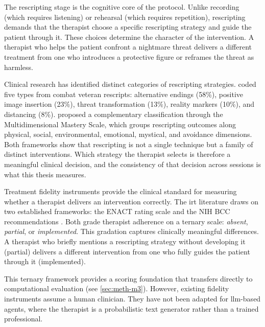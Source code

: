 The rescripting stage is the cognitive core of the protocol. Unlike recording
(which requires listening) or rehearsal (which requires repetition), rescripting
demands that the therapist choose a specific rescripting strategy and guide
the patient through it. These choices determine the character of the
intervention. A therapist who helps the patient confront a nightmare threat
delivers a different treatment from one who introduces a protective figure
or reframes the threat as harmless.

Clinical research has identified distinct categories of rescripting
strategies. \textcite{25UR8BHJ} coded five types from combat veteran
rescripts: alternative endings (58\%), positive image insertion (23\%),
threat transformation (13\%), reality markers (10\%), and distancing (8\%).
\textcite{62ZMHBC3} proposed a complementary classification through the
Multidimensional Mastery Scale, which groups rescripting outcomes along
physical, social, environmental, emotional, mystical, and avoidance
dimensions. Both frameworks show that rescripting is not a single
technique but a family of distinct interventions. Which strategy the
therapist selects is therefore a meaningful clinical decision, and the
consistency of that decision across sessions is what this thesis measures.

Treatment fidelity instruments provide the clinical standard for measuring
whether a therapist delivers an intervention correctly. The \gls{irt}
literature draws on two established frameworks: the ENACT rating
scale \parencite{GYNNP2CC} and the NIH BCC recommendations
\parencite{ITT882KN}. Both grade therapist adherence on a ternary scale:
\emph{absent}, \emph{partial}, or \emph{implemented}. This gradation
captures clinically meaningful differences. A therapist who briefly mentions
a rescripting strategy without developing it (partial) delivers a different
intervention from one who fully guides the patient through it (implemented).

This ternary framework provides a scoring foundation that transfers directly
to computational evaluation (see \autoref{sec:meth-m3}). However, existing
fidelity instruments assume a human clinician. They have not been adapted for
\gls{llm}-based agents, where the therapist is a probabilistic text generator
rather than a trained professional.



